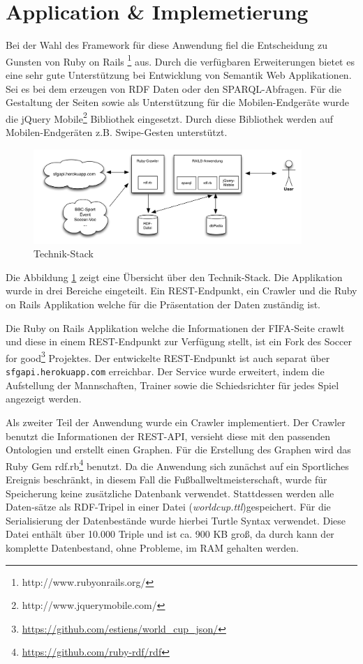 \documentclass[runningheads,a4paper]{llncs}
\begin{document}
\section{Application \& Implemetierung}


Bei der Wahl des Framework für diese Anwendung fiel die Entscheidung zu Gunsten von Ruby on Rails \footnote{http://www.rubyonrails.org/} aus. Durch die verfügbaren Erweiterungen bietet es eine sehr gute Unterstützung bei Entwicklung von Semantik Web Applikationen. Sei es bei dem erzeugen von RDF Daten oder den SPARQL-Abfragen. Für die Gestaltung der Seiten sowie als Unterstützung für die Mobilen-Endgeräte wurde die jQuery Mobile\footnote{http://www.jquerymobile.com/} Bibliothek eingesetzt. Durch diese Bibliothek werden auf Mobilen-Endgeräten z.B. Swipe-Gesten unterstützt. 

\begin{figure}
\centering
\includegraphics[height=3.6cm]{technik-stack}
\caption{Technik-Stack}
\label{fig:example}
\end{figure}

Die Abbildung \ref{fig:example} zeigt eine Übersicht über den Technik-Stack. Die Applikation wurde in drei Bereiche eingeteilt. Ein REST-Endpunkt, ein Crawler und die Ruby on Rails Applikation welche für die Präsentation der Daten zuständig ist.

Die Ruby on Rails Applikation welche die Informationen der FIFA-Seite crawlt und diese in einem REST-Endpunkt zur Verfügung stellt, ist ein Fork des Soccer for good\footnote{\url{https://github.com/estiens/world_cup_json/}} Projektes. Der entwickelte REST-Endpunkt ist auch separat über \texttt{sfgapi.herokuapp.com} erreichbar. Der Service wurde erweitert, indem die Aufstellung der Mannschaften, Trainer sowie die Schiedsrichter für jedes Spiel angezeigt werden. 

Als zweiter Teil der Anwendung wurde ein Crawler implementiert. Der Crawler benutzt die Informationen der REST-API, versieht diese mit den passenden Ontologien und erstellt einen Graphen. Für die Erstellung des Graphen wird das Ruby Gem rdf.rb\footnote{\url{https://github.com/ruby-rdf/rdf}} benutzt. Da die Anwendung sich zunächst auf ein Sportliches Ereignis beschränkt, in diesem Fall die Fußballweltmeisterschaft, wurde für Speicherung keine zusätzliche Datenbank verwendet. Stattdessen werden alle Daten-sätze als RDF-Tripel in einer Datei (\textit{worldcup.ttl})gespeichert. Für die Serialisierung der Datenbestände wurde hierbei Turtle Syntax verwendet. Diese Datei enthält über 10.000 Triple und ist ca. 900 KB groß, da durch kann der komplette Datenbestand, ohne Probleme, im RAM gehalten werden.
\newpage
\end{document}
